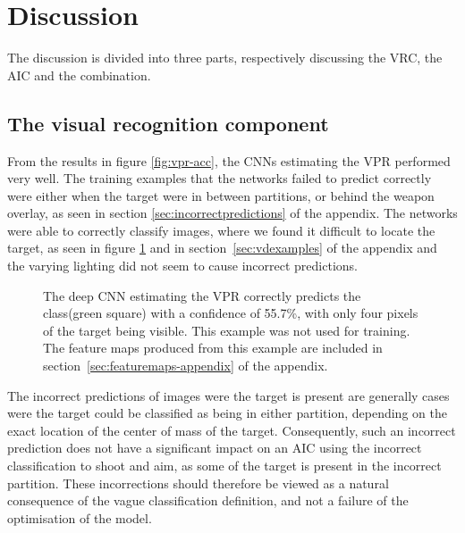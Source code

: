 
\section{Discussion}
\label{sec:discussion}
The discussion is divided into three parts, respectively discussing the VRC, the AIC and the combination.

\subsection{The visual recognition component}
From the results in figure \ref{fig:vpr-acc}, the CNNs estimating the VPR performed very well. The training examples that the networks failed to predict correctly were either when the target were in between partitions, or behind the weapon overlay, as seen in section \ref{sec:incorrectpredictions} of the appendix. The networks were able to correctly classify images, where we found it difficult to locate the target, as seen in figure \ref{fig:hardprediction} and in section~\ref{sec:vdexamples} of the appendix and the varying lighting did not seem to cause incorrect predictions.

\begin{figure}[H]
	\begin{scriptsize}
		\sffamily
		\def\svgwidth{\textwidth}
		
	\end{scriptsize}
	\caption[Difficult VPR classification example]{The deep CNN estimating the VPR correctly predicts the class(green square) with a confidence of 55.7\%, with only four pixels of the target being visible. This example was not used for training. The feature maps produced from this example are included in section~\ref{sec:featuremaps-appendix} of the appendix.}
	\label{fig:hardprediction}
\end{figure}

The incorrect predictions of images were the target is present are generally cases were the target could be classified as being in either partition, depending on the exact location of the center of mass of the target. Consequently, such an incorrect prediction does not have a significant impact on an AIC using the incorrect classification to shoot and aim, as some of the target is present in the incorrect partition. These incorrections should therefore be viewed as a natural consequence of the vague classification definition, and not a failure of the optimisation of the model.

